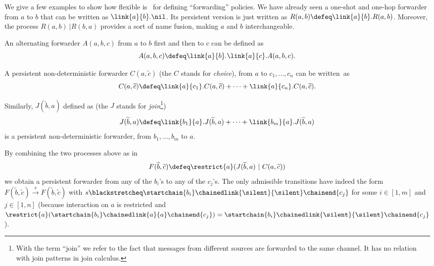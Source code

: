 \begin{example}[Forwarders]
We give a few examples to show how flexible is \CNA\ for defining ``forwarding'' policies.
We have already seen a one-shot and one-hop forwarder from $a$ to $b$ that can be written as $\link{a}{b}.\nil$.
Its persistent version is just written as $R(a,b) \defeq \link{a}{b}.R(a,b)$.
Moreover, the process $R(a,b) \ | R(b,a)$ provides a sort of name fusion, making $a$ and $b$ interchangeable.

An alternating forwarder $A(a,b,c)$ from $a$ to $b$ first and then to $c$ can be defined as 
\[A(a,b,c) \defeq \link{a}{b}.\link{a}{c}.A(a,b,c).\]

A persistent non-deterministic forwarder $C(a,\widetilde{c})$ (the $C$ stands for \emph{choice}), from $a$ to $c_{1},...,c_{n}$ can be \mbox{written as} 
\[C(a,\widetilde{c}) \defeq \link{a}{c_{1}}.C(a,\widetilde{c})+ \cdots + \link{a}{c_{n}}.C(a,\widetilde{c}).\]

Similarly, $J(\widetilde{b},a)$ defined as (the $J$ stands for \emph{join}\footnote{With the term ``join'' we refer to the fact that messages from different sources are forwarded to the same channel. It has no relation with join patterns in join calculus.})
\[J(\widetilde{b},a)\defeq \link{b_{1}}{a}.J(\widetilde{b},a) + \cdots + \link{b_{m}}{a}.J(\widetilde{b},a)\] 
is a persistent non-deterministic forwarder, from $b_{1},...,b_{m}$ to $a$.

By combining the two processes above as in
\[F(\widetilde{b},\widetilde{c}) \defeq \restrict{a}(J(\widetilde{b},a)\ |\ C(a,\widetilde{c}))\]
we obtain a persistent forwarder from any of  the $b_{i}$'s  to any of the $c_{j}$'s.
The only admissible transitions have indeed the form
$
F(\widetilde{b},\widetilde{c})  \xrightarrow{s} F(\widetilde{b},\widetilde{c})
$
with $s \blackstretcheq \startchain{b_i}\chainedlink{\silent}{\silent}\chainend{c_j}$ for some $i\in[1,m]$ and $j\in[1,n]$ (because interaction on $a$ is restricted and $\restrict{a}(\startchain{b_i}\chainedlink{a}{a}\chainend{c_j}) = \startchain{b_i}\chainedlink{\silent}{\silent}\chainend{c_j}$).
\end{example}

